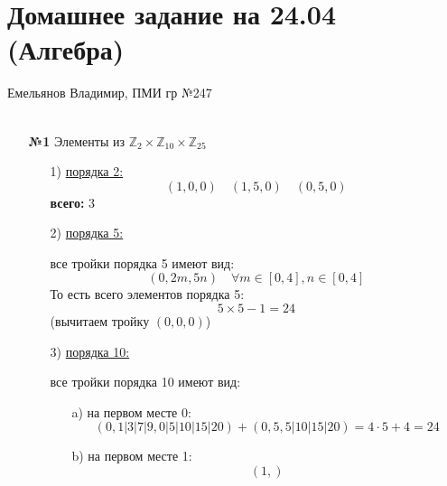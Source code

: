 \documentclass[a4paper]{article}
\newcommand{\ZZ}{\mathbb{Z}}
\begin{document}
\section*{Домашнее задание на 24.04 (Алгебра)}
 {\large Емельянов Владимир, ПМИ гр №247}\\\\
\begin{enumerate}
    \item[\textbf{№1}]Элементы из $\ZZ_2 \times \ZZ_{10} \times \ZZ_{25}$
    \begin{enumerate}
        \item[1)]
        \underline{порядка 2:}
        $$(1, 0, 0)\quad (1, 5, 0) \quad (0, 5, 0)$$
        \textbf{всего: }$3$

        \item[2)]
        \underline{порядка 5:}

        все тройки порядка 5 имеют вид:
        $$(0, 2m, 5n) \quad  \forall m \in [0, 4], n \in [0, 4]$$
        То есть всего элементов порядка 5:
        $$5 \times 5 - 1 = 24$$
        (вычитаем тройку $(0, 0, 0)$)

        \item[3)]
        \underline{порядка 10:}

        все тройки порядка 10 имеют вид:
        \begin{enumerate}
            \item[a)] на первом месте 0:
            $$(0, 1|3|7|9, 0|5|10|15|20) + (0, 5, 5|10|15|20) = 4\cdot 5 + 4 = 24$$
            \item[b)] на первом месте 1:
            $$(1, )$$
        \end{enumerate}

    \end{enumerate}




\end{enumerate}
\end{document}
